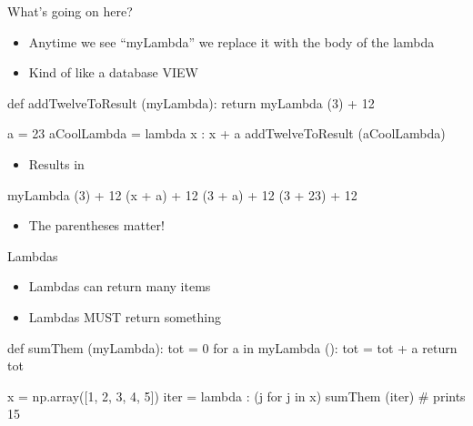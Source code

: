 \documentclass[aspectratio=169]{beamer}
\begin{document}
\begin{frame}[fragile]{What's going on here?}

\begin{itemize}
\item Anytime we see ``myLambda'' we replace it with the body of the lambda 
\item Kind of like a database VIEW
\end{itemize}

\begin{SQL}
def addTwelveToResult (myLambda):
     return myLambda (3) + 12

a = 23
aCoolLambda = lambda x : x + a
addTwelveToResult (aCoolLambda) 
\end{SQL}

\begin{itemize}
\item Results in 
\end{itemize}

\begin{SQL}
myLambda (3) + 12
(x + a) + 12
(3 + a) + 12
(3 + 23) + 12 
\end{SQL}

\begin{itemize}
\item The parentheses matter!
\end{itemize}


\end{frame}


\begin{frame}[fragile]{Lambdas}

\begin{itemize}
\item Lambdas can return many items
\item Lambdas MUST return something
\end{itemize}

\begin{SQL}
def sumThem (myLambda):
     tot = 0
     for a in myLambda ():
          tot = tot + a
     return tot

x = np.array([1, 2, 3, 4, 5])
iter = lambda : (j for j in x)
sumThem (iter) # prints 15
\end{SQL}
\end{frame}
\end{document}
